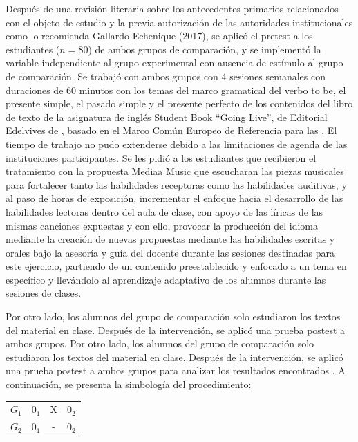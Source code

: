 \documentclass[spanish]{textolivre}
\begin{document}
Después de una revisión literaria sobre los antecedentes primarios relacionados con el objeto de estudio y la previa autorización de las autoridades institucionales como lo recomienda Gallardo-Echenique (2017), se aplicó el pretest a los estudiantes ($n=80$) de ambos grupos de comparación, y se implementó la variable independiente al grupo experimental con ausencia de estímulo al grupo de comparación. Se trabajó con ambos grupos con 4 sesiones semanales con duraciones de 60 minutos con los temas del marco gramatical del verbo to be, el presente simple, el pasado simple y el presente perfecto de los contenidos del libro de texto de la asignatura de inglés Student Book “Going Live”, de Editorial Edelvives de \textcite{robin2015}, basado en el Marco Común Europeo de Referencia para las \textcite{mcerl2001}. El tiempo de trabajo no pudo extenderse debido a las limitaciones de agenda de las instituciones participantes. Se les pidió a los estudiantes que recibieron el tratamiento con la propuesta Mediaa Music que escucharan las piezas musicales para fortalecer tanto las habilidades receptoras como las habilidades auditivas, y al paso de horas de exposición, incrementar el enfoque hacia el desarrollo de las habilidades lectoras dentro del aula de clase, con apoyo de las líricas de las mismas canciones expuestas y con ello, provocar la producción del idioma mediante la creación de nuevas propuestas mediante las habilidades escritas y orales bajo la asesoría y guía del docente durante las sesiones destinadas para este ejercicio, partiendo de un contenido preestablecido y enfocado a un tema en específico y llevándolo al aprendizaje adaptativo de los alumnos durante las sesiones de clases.

Por otro lado, los alumnos del grupo de comparación solo estudiaron los textos del material en clase. Después de la intervención, se aplicó una prueba postest a ambos grupos. Por otro lado, los alumnos del grupo de comparación solo estudiaron los textos del material en clase. Después de la intervención, se aplicó una prueba postest a ambos grupos para analizar los resultados encontrados \cite{hernandez2014metodologia}. A continuación, se presenta la simbología del procedimiento:

\begin{center}
    \begin{tabular}{cccc}
    $G_1$ & $0_1$ & X & $0_2$ \\
    $G_2$ & $0_1$ & - & $0_2$ 
    \end{tabular}
\end{center}
\end{document}
